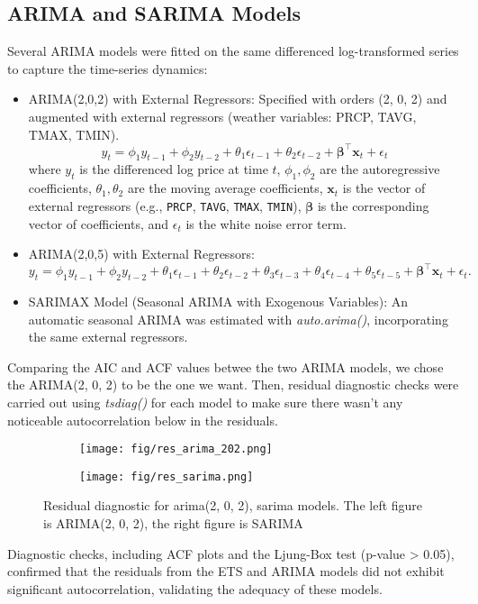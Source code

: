 \documentclass[10pt]{article}
\begin{document}
\vspace{1em}
\subsection{ARIMA and SARIMA Models}
Several ARIMA models were fitted on the same differenced log-transformed series to capture the time-series dynamics: 
\begin{itemize}
    \item ARIMA(2,0,2) with External Regressors: Specified with orders (2, 0, 2) and augmented with external regressors (weather variables: PRCP, TAVG, TMAX, TMIN).
    $$ y_t = \phi_1 y_{t-1} + \phi_2 y_{t-2} + \theta_1 \epsilon_{t-1} + \theta_2 \epsilon_{t-2} + \bm{\beta}^\top \mathbf{x}_t + \epsilon_t $$ 
    where $y_t$ is the differenced log price at time $t$, $\phi_1, \phi_2$ are the autoregressive coefficients, $\theta_1, \theta_2$ are the moving average coefficients, $\mathbf{x}_t$ is the vector of external regressors (e.g., \texttt{PRCP}, \texttt{TAVG}, \texttt{TMAX}, \texttt{TMIN}), $\bm{\beta}$ is the corresponding vector of coefficients, and $\epsilon_t$ is the white noise error term.
    \item ARIMA(2,0,5) with External Regressors:
    $$
    y_t = \phi_1 y_{t-1} + \phi_2 y_{t-2} + \theta_1 \epsilon_{t-1} + \theta_2 \epsilon_{t-2} + \theta_3 \epsilon_{t-3} + \theta_4 \epsilon_{t-4} + \theta_5 \epsilon_{t-5} + \bm{\beta}^\top \mathbf{x}_t + \epsilon_t.
    $$
    \item SARIMAX Model (Seasonal ARIMA with Exogenous Variables): An automatic seasonal ARIMA was estimated with \emph{auto.arima()}, incorporating the same external regressors.
\end{itemize}
\noindent
Comparing the AIC and ACF values betwee the two ARIMA models, we chose the ARIMA(2, 0, 2) to be the one we want. Then, residual diagnostic checks were carried out using \emph{tsdiag()} for each model to make sure there wasn’t any noticeable autocorrelation below in the residuals. 
\begin{figure}[h!]
    \captionsetup{font=scriptsize}
    \centering
    \begin{subfigure}[b]{0.47\textwidth}
        \centering
        \texttt{[image: fig/res\_arima\_202.png]}
        \label{fig:m5_c2}
    \end{subfigure}
    \begin{subfigure}[b]{0.47\textwidth}
        \centering
        \texttt{[image: fig/res\_sarima.png]}
        \label{fig:m5_qq}
    \end{subfigure}
    \caption{Residual diagnostic for arima(2, 0, 2), sarima models. The left figure is ARIMA(2, 0, 2), the right figure is SARIMA}
    \label{fig:res}
\end{figure}
\noindent
Diagnostic checks, including ACF plots and the Ljung-Box test (p-value > 0.05), confirmed that the residuals from the ETS and ARIMA models did not exhibit significant autocorrelation, validating the adequacy of these models.
\end{document}
